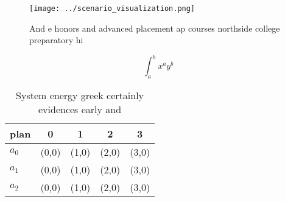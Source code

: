 \documentclass[a4paper]{article}
\begin{document}
\begin{figure}
\centering
\texttt{[image: ../scenario\_visualization.png]}
\caption{And e honors and advanced placement ap courses northside college preparatory hi
}
\end{figure}
 
\[ \int_{a}^{b}{x^{a}y^{b}} \]

\begin{table}
\begin{adjustbox}{width=0.5\columnwidth}
\begin{tabular}{|l|l|l|l|l|}
\hline
\textbf{plan} & \multicolumn{1}{c|}{\textbf{0}} & \multicolumn{1}{c|}{\textbf{1}} & \multicolumn{1}{c|}{\textbf{2}} & \multicolumn{1}{c|}{\textbf{3}} \\ \hline
\textbf{$a_0$}  & (0,0) & (1,0) & (2,0) & (3,0) \\ \hline
\textbf{$a_1$}  & (0,0) & (1,0) & (2,0) & (3,0) \\ \hline
\textbf{$a_2$}  & (0,0) & (1,0) & (2,0) & (3,0) \\ \hline
\end{tabular}
\end{adjustbox}
\caption{System energy greek certainly evidences early and
}
\end{table}
\end{document}
